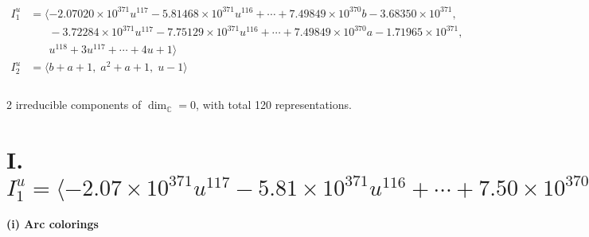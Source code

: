 \documentclass[1p]{elsarticle_modified}
\theoremstyle{definition}
\begin{document}
\begin{align*}
I^u_{1}&=\langle 
-2.07020\times10^{371} u^{117}-5.81468\times10^{371} u^{116}+\cdots+7.49849\times10^{370} b-3.68350\times10^{371},\\
\phantom{I^u_{1}}&\phantom{= \langle  }-3.72284\times10^{371} u^{117}-7.75129\times10^{371} u^{116}+\cdots+7.49849\times10^{370} a-1.71965\times10^{371},\\
\phantom{I^u_{1}}&\phantom{= \langle  }u^{118}+3 u^{117}+\cdots+4 u+1\rangle \\
I^u_{2}&=\langle 
b+a+1,\;a^2+a+1,\;u-1\rangle \\
\\
\end{align*}
\raggedright * 2 irreducible components of $\dim_{\mathbb{C}}=0$, with total 120 representations.\\
\newpage
\renewcommand{\arraystretch}{1}
\centering \section*{I. $I^u_{1}= \langle -2.07\times10^{371} u^{117}-5.81\times10^{371} u^{116}+\cdots+7.50\times10^{370} b-3.68\times10^{371},\;-3.72\times10^{371} u^{117}-7.75\times10^{371} u^{116}+\cdots+7.50\times10^{370} a-1.72\times10^{371},\;u^{118}+3 u^{117}+\cdots+4 u+1 \rangle$}
\flushleft \textbf{(i) Arc colorings}\\
\end{document}
